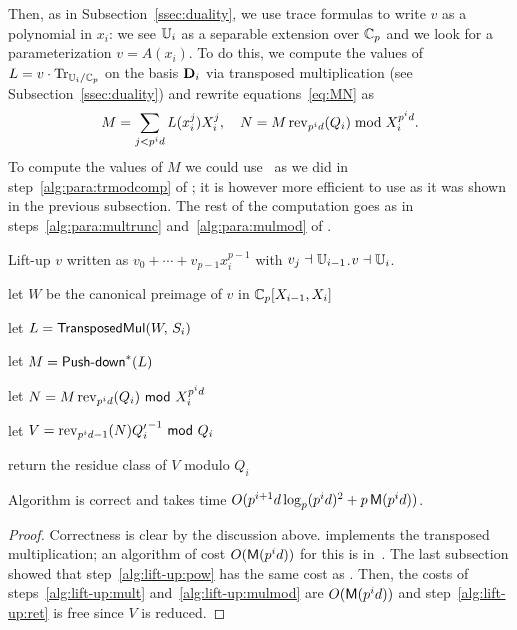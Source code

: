 Then, as in Subsection~\ref{ssec:duality}, we use trace formulas to
write $v$ as a polynomial in $x_i$: we see $\mathbb{U}_i$ as a separable
extension over $\mathbb{C}_p$ and we look for a parameterization
$v=A(x_i)$. To do this, we compute the values of
$L=v\cdot\operatorname{Tr}_{\mathbb{U}_i/\mathbb{C}_p}$ on the basis $\mathbf{D}_i$ via transposed
multiplication (see Subsection~\ref{ssec:duality}) and rewrite
equations~\eqref{eq:MN} as
\begin{equation}
  \label{eq:MNliftup}
  M = \sum_{j < p^id}L(x_i^j)X_i^j,\quad N = M\operatorname{rev}_{p^id}(Q_i) \bmod X_i^{p^id}.
\end{equation}
To compute the values of $M$ we could use~\cite[Th.~4]{Sho94} as we
did in step~\ref{alg:para:trmodcomp} of ; it
is however more efficient to use  as it was
shown in the previous subsection. The rest of the computation goes as
in steps~\ref{alg:para:multrunc} and~\ref{alg:para:mulmod} of
.

\begin{algorithm}{Lift-up}
  { $v$ written as $v_0+\cdots+v_{p-1}x_i^{p-1}$ with $v_j \dashv \mathbb{U}_{i-1}$.}{$v\dashv \mathbb{U}_i$.}
\item let $W$ be the canonical preimage of $v$ in $\mathbb{C}_p[X_{i-1},X_i]$
\item \label{alg:lift-up:transmul} let $L = {\sf TransposedMul}(W,\,S_i)$
\item \label{alg:lift-up:pow} let $M={\text{\sf Push-down}}^\ast(L)$
\item \label{alg:lift-up:mult} let $N = M \operatorname{rev}_{p^id}(Q_i) {\sf ~mod~} X_i^{p^id}$
\item \label{alg:lift-up:mulmod} let $V=\operatorname{rev}_{p^id-1}(N) {Q_i'}^{-1} {\sf ~mod~} Q_i$
\item \label{alg:lift-up:ret} return the residue class of $V$ modulo $Q_i$
\end{algorithm}

\begin{proposition}\label{prop:lu}
 Algorithm  is correct and takes time $O(p^{i+1}d\log_p(p^id)^2+p\,\mathrm{\sf M}(p^{i}d))$.
\end{proposition}
\begin{proof} Correctness is clear by the discussion
above.  implements the transposed multiplication;
an algorithm of cost $O(\mathrm{\sf M}(p^id))$ for this is
in~\cite[Coro.~2]{PS06}.  The last subsection showed that
step~\ref{alg:lift-up:pow} has the same cost as . Then,
the costs of steps~\ref{alg:lift-up:mult} and~\ref{alg:lift-up:mulmod}
are $O(\mathrm{\sf M}(p^id))$ and step~\ref{alg:lift-up:ret} is free since $V$
is reduced.\end{proof}


